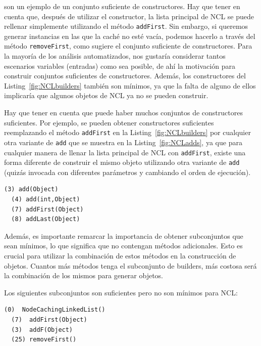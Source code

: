  son un ejemplo de un conjunto suficiente de constructores. Hay que tener en cuenta que, después de utilizar el constructor, la lista principal de NCL se puede rellenar simplemente utilizando el método \texttt{addFirst}. Sin embargo, si queremos generar instancias en las que la caché no esté vacía, podemos hacerlo a través del método \texttt{removeFirst}, como sugiere el conjunto suficiente de constructores. Para la mayoría de los análisis automatizados, nos gustaría considerar tantos escenarios variables (entradas) como sea posible, de ahí la motivación para construir conjuntos suficientes de constructores. Además, los constructores del Listing~\ref{fig:NCLbuilders} también son mínimos, ya que la falta de alguno de ellos implicaría que algunos objetos de NCL ya no se pueden construir.

Hay que tener en cuenta que puede haber muchos conjuntos de constructores suficientes. Por ejemplo, se pueden obtener constructores suficientes reemplazando el método \texttt{addFirst} en la Listing~\ref{fig:NCLbuilders} por cualquier otra variante de \texttt{add} que se muestra en la Listing~\ref{fig:NCLadds}, ya que para cualquier manera de llenar la lista principal de NCL con \texttt{addFirst}, existe una forma diferente de construir el mismo objeto utilizando otra variante de \texttt{add} (quizás invocada con diferentes parámetros y cambiando el orden de ejecución).
\\
\begin{lstlisting}[numbers=none,label=fig:NCLadds, caption=Variantes del método 'Add' que puedo ser utilizado para rellanar la lista principal en NCL, captionpos=b, frame=tb , basicstyle=\scriptsize]
  (3) add(Object)
  (4) add(int,Object)
  (7) addFirst(Object)
  (8) addLast(Object)
\end{lstlisting}


Además, es importante remarcar la importancia de obtener subconjuntos que sean mínimos, lo que significa que no contengan métodos adicionales. Esto es crucial para utilizar la combinación de estos métodos en la construcción de objetos. Cuantos más métodos tenga el subconjunto de builders, más costosa será la combinación de los mismos para generar objetos.

Los siguientes subconjuntos son suficientes pero no son mínimos para NCL:
\\

\begin{lstlisting}[numbers=none,label=fig:NCLadds, frame=tb , basicstyle=\scriptsize]
  (0)  NodeCachingLinkedList()
  (7)  addFirst(Object)
  (3)  addF(Object)
  (25) removeFirst()
\end{lstlisting}

